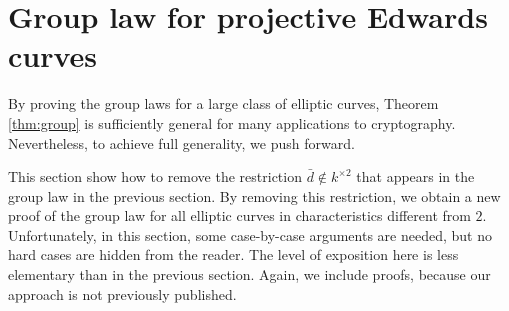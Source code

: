 \documentclass{llncs}
\begin{document}



\section{Group law for projective Edwards curves}\label{sec:proj}

By proving the group laws for a large class of elliptic curves,
Theorem \ref{thm:group} is sufficiently general for many applications
to cryptography.  Nevertheless, to achieve full generality, we
push forward.

This section show how to remove the restriction $\bar d\not\in
k^{\times 2}$ that appears in the group law in the previous section.
By removing this restriction, we obtain a new proof of the group law
for all elliptic curves in characteristics different from $2$.
Unfortunately, in this section, some case-by-case arguments are
needed, but no hard cases are hidden from the reader.  The level of
exposition here is less elementary than in the previous section.
Again, we include proofs, because our approach is not previously published.
\end{document}
